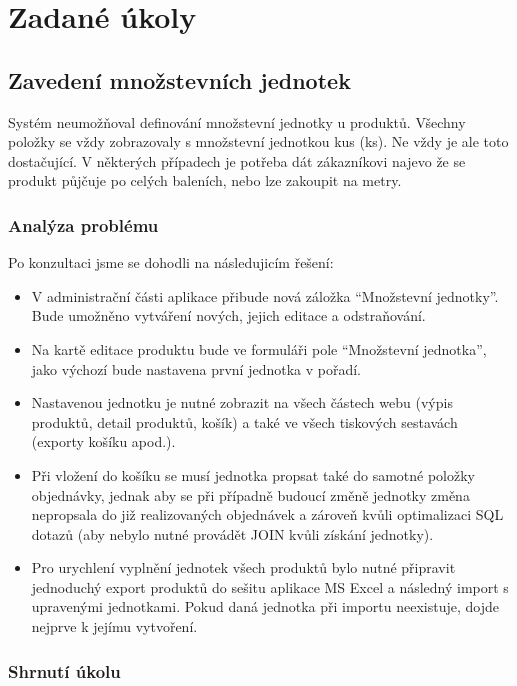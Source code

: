 \chapter{Zadané úkoly}

\section{Zavedení množstevních jednotek}

Systém neumožňoval definování množstevní jednotky u produktů. Všechny položky se vždy zobrazovaly s množstevní jednotkou kus (ks). Ne vždy je ale toto dostačující. V některých případech je potřeba dát zákazníkovi najevo že se produkt půjčuje po celých baleních, nebo lze zakoupit na metry.

\subsection{Analýza problému}

Po konzultaci jsme se dohodli na následujicím řešení:



\begin{itemize}
    \item V administrační části aplikace přibude nová záložka \enquote{Množstevní jednotky}. Bude umožněno vytváření nových, jejich editace a odstraňování.
    \item Na kartě editace produktu bude ve formuláři pole \enquote{Množstevní jednotka}, jako výchozí bude nastavena první jednotka v pořadí.
    \item Nastavenou jednotku je nutné zobrazit na všech částech webu (výpis produktů, detail produktů, košík) a také ve všech tiskových sestavách (exporty košíku apod.). 
    \item Při vložení do košíku se musí jednotka propsat také do samotné položky objednávky, jednak aby se při případně budoucí změně jednotky změna nepropsala do již realizovaných objednávek a zároveň kvůli optimalizaci SQL dotazů (aby nebylo nutné provádět JOIN kvůli získání jednotky).
    \item Pro urychlení vyplnění jednotek všech produktů bylo nutné připravit jednoduchý export produktů do sešitu aplikace MS Excel a následný import s upravenými jednotkami. Pokud daná jednotka při importu neexistuje, dojde nejprve k jejímu vytvoření.
\end{itemize}

\subsection{Shrnutí úkolu}

